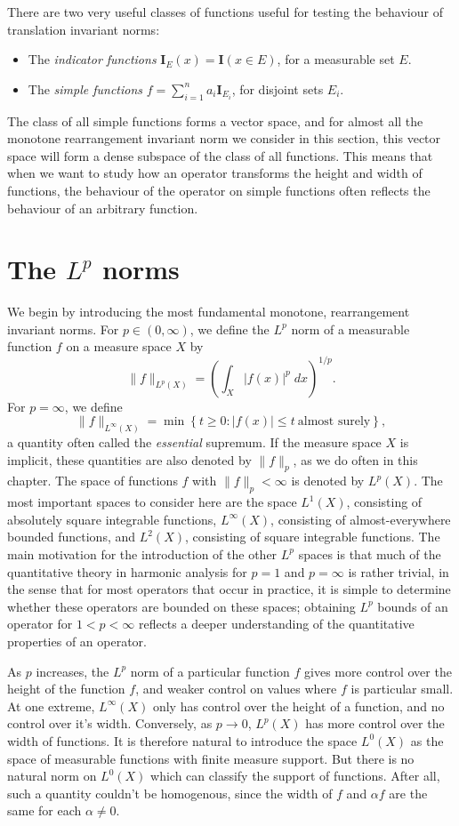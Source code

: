 There are two very useful classes of functions useful for testing the behaviour of translation invariant norms:
%
\begin{itemize}
    \item The \emph{indicator functions} $\mathbf{I}_E(x) = \mathbf{I}(x \in E)$, for a measurable set $E$.
    \item The \emph{simple functions} $f = \sum_{i = 1}^n a_i \mathbf{I}_{E_i}$, for disjoint sets $E_i$.
\end{itemize}
%
The class of all simple functions forms a vector space, and for almost all the monotone rearrangement invariant norm we consider in this section, this vector space will form a dense subspace of the class of all functions. This means that when we want to study how an operator transforms the height and width of functions, the behaviour of the operator on simple functions often reflects the behaviour of an arbitrary function.

\section{The $L^p$ norms}

We begin by introducing the most fundamental monotone, rearrangement invariant norms. For $p \in (0,\infty)$, we define the $L^p$ norm of a measurable function $f$ on a measure space $X$ by
%
\[ \| f \|_{L^p(X)} = \left( \int_X |f(x)|^p\; dx \right)^{1/p}. \]
%
For $p = \infty$, we define
%
\[ \| f \|_{L^\infty(X)} = \min \left\{ t \geq 0: |f(x)| \leq t\ \text{almost surely} \right\}, \]
%
a quantity often called the \emph{essential} supremum. If the measure space $X$ is implicit, these quantities are also denoted by $\| f \|_p$, as we do often in this chapter. The space of functions $f$ with $\| f \|_p < \infty$ is denoted by $L^p(X)$. The most important spaces to consider here are the space $L^1(X)$, consisting of absolutely square integrable functions, $L^\infty(X)$, consisting of almost-everywhere bounded functions, and $L^2(X)$, consisting of square integrable functions. The main motivation for the introduction of the other $L^p$ spaces is that much of the quantitative theory in harmonic analysis for $p = 1$ and $p = \infty$ is rather trivial, in the sense that for most operators that occur in practice, it is simple to determine whether these operators are bounded on these spaces; obtaining $L^p$ bounds of an operator for $1 < p < \infty$ reflects a deeper understanding of the quantitative properties of an operator.

As $p$ increases, the $L^p$ norm of a particular function $f$ gives more control over the height of the function $f$, and weaker control on values where $f$ is particular small. At one extreme, $L^\infty(X)$ only has control over the height of a function, and no control over it's width. Conversely, as $p \to 0$, $L^p(X)$ has more control over the width of functions. It is therefore natural to introduce the space $L^0(X)$ as the space of measurable functions with finite measure support. But there is no natural norm on $L^0(X)$ which can classify the support of functions. After all, such a quantity couldn't be homogenous, since the width of $f$ and $\alpha f$ are the same for each $\alpha \neq 0$.

